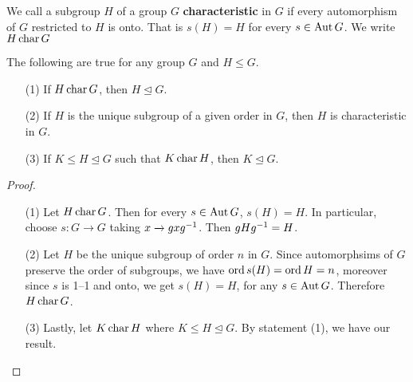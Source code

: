 \begin{definition}
    We call a subgroup $H$ of a group  $G$  \textbf{characteristic} in $G$ if
    every automorphism of $G$ restricted to  $H$ is onto. That is $s(H)=H$ for
    every $s \in \operatorname{Aut}{G}$. We write $H \operatorname{char}{G}$
\end{definition}

\begin{lemma}\label{4.4.4}
    The following are true for any group $G$ and  $H \leq G$.
    \begin{enumerate}
         \item[(1)] If $H \operatorname{char}{G}$, then $H \unlhd{G}$.

         \item[(2)] If $H$ is the unique subgroup of a given order in  $G$, then
              $H$ is characteristic in  $G$.

          \item[(3)] If $K \leq H \unlhd G$ such that  $K \operatorname{char}{H}$, then $K
              \unlhd G$.
    \end{enumerate}
\end{lemma}
\begin{proof}
    \begin{enumerate}
        \item[(1)] Let $H \operatorname{char}{G}$. Then for every $s \in \operatorname{Aut}{G}$, $s(H)=H$.
            In particular, choose $s:G \xrightarrow{} G$ taking $x
            \xrightarrow{} gxg^{-1}$. Then $gHg^{-1}=H$.

        \item[(2)] Let $H$ be the unique subgroup of order $n$ in $G$. Since
            automorphsims of $G$ preserve the order of subgroups, we have
            $\operatorname{ord}{s(H)}=\operatorname{ord}{H}=n$, moreover since $s$ is 1--1 and onto, we get
             $s(H)=H$, for any $s \in \operatorname{Aut}{G}$. Therefore $H \operatorname{char}{G}$.

         \item[(3)] Lastly, let $K \operatorname{char}{H}$ where $K \leq H \unlhd G$. By
             statement (1), we have our result.
    \end{enumerate}
\end{proof}


